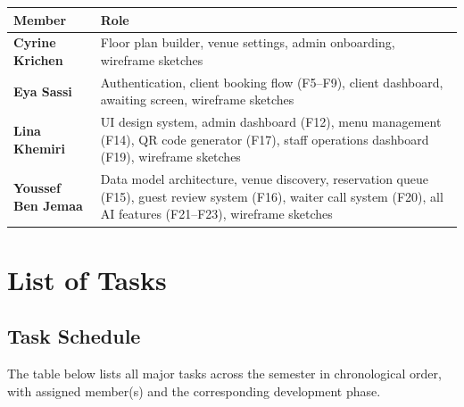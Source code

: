 \documentclass[12pt,a4paper,oneside]{report}
\begin{document}
\begin{tabularx}{\linewidth}{>{\bfseries}lX}
  \toprule
  Member & Role \\
  \midrule
  Cyrine Krichen & Floor plan builder, venue settings, admin onboarding,
                   wireframe sketches \\
  \addlinespace
  Eya Sassi & Authentication, client booking flow (F5--F9), client
              dashboard, awaiting screen, wireframe sketches \\
  \addlinespace
  Lina Khemiri & UI design system, admin dashboard (F12), menu management
                 (F14), QR code generator (F17), staff operations dashboard
                 (F19), wireframe sketches \\
  \addlinespace
  Youssef Ben Jemaa & Data model architecture, venue discovery, reservation
                      queue (F15), guest review system (F16), waiter call
                      system (F20), all AI features (F21--F23),
                      wireframe sketches \\
  \bottomrule
\end{tabularx}

\section{List of Tasks}

\subsection{Task Schedule}

The table below lists all major tasks across the semester in chronological
order, with assigned member(s) and the corresponding development phase.
\end{document}
